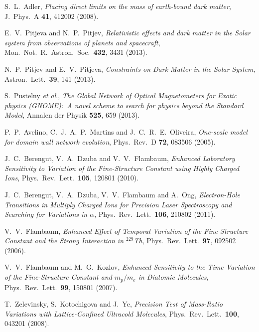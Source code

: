 \documentclass[aps,prd,onecolumn,nofootinbib]{revtex4-2} %
\begin{document}
\begin{thebibliography}{99}
 S.~L.~Adler, \textit{Placing direct limits on the mass of earth-bound dark matter}, J.~Phys.~A \textbf{41}, 412002 (2008). 

 E.~V.~Pitjeva and N.~P.~Pitjev, \textit{Relativistic effects and dark matter in the Solar system from observations of planets and spacecraft}, Mon.~Not.~R.~Astron.~Soc.~\textbf{432}, 3431 (2013). 

 N.~P.~Pitjev and E.~V.~Pitjeva, \textit{Constraints on Dark Matter in the Solar System}, Astron.~Lett.~\textbf{39}, 141 (2013). 


 S.~Pustelny \textit{et al}., \textit{The Global Network of Optical Magnetometers for Exotic physics (GNOME):~A novel scheme to search for physics beyond the Standard Model}, Annalen der Physik \textbf{525}, 659 (2013). 


 P.~P.~Avelino, C.~J.~A.~P.~Martins and J.~C.~R.~E.~Oliveira, \textit{One-scale model for domain wall network evolution}, Phys.~Rev.~D \textbf{72}, 083506 (2005). 


 J.~C.~Berengut, V.~A.~Dzuba and V.~V.~Flambaum, \textit{Enhanced Laboratory Sensitivity to Variation of the Fine-Structure Constant using Highly Charged Ions}, Phys.~Rev.~Lett.~\textbf{105}, 120801 (2010). 

 J.~C.~Berengut, V.~A.~Dzuba, V.~V.~Flambaum and A.~Ong, \textit{Electron-Hole Transitions in Multiply Charged Ions for Precision Laser Spectroscopy and Searching for Variations in $\alpha$}, Phys.~Rev.~Lett.~\textbf{106}, 210802 (2011). 

 V.~V.~Flambaum, \textit{Enhanced Effect of Temporal Variation of the Fine Structure Constant and the Strong Interaction in $^{229}$Th}, Phys.~Rev.~Lett.~\textbf{97}, 092502 (2006). 

 V.~V.~Flambaum and M.~G.~Kozlov, \textit{Enhanced Sensitivity to the Time Variation of the Fine-Structure Constant and $m_p / m_e$ in Diatomic Molecules}, Phys.~Rev.~Lett.~\textbf{99}, 150801 (2007). 

 T.~Zelevinsky, S.~Kotochigova and J.~Ye, \textit{Precision Test of Mass-Ratio Variations with Lattice-Confined Ultracold Molecules}, Phys.~Rev.~Lett.~\textbf{100}, 043201 (2008). 


\end{thebibliography}
\end{document}
